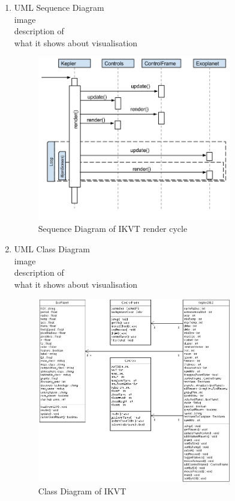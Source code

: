 \begin{enumerate}


 \item UML Sequence Diagram
  \\image\\description of\\what it shows about visualisation
   \begin{figure}[h!]
  \centering
      \includegraphics[width=0.8\textwidth]{images/sequence.png}
  \caption{Sequence Diagram of IKVT render cycle}  
\end{figure}

 \item UML Class Diagram
 \\image\\description of\\what it shows about visualisation
 \begin{figure}[h!]
  \centering
      \includegraphics[width=0.8\textwidth]{images/classDiagram.png}
  \caption{Class Diagram of IKVT}  
\end{figure}
 

\end{enumerate}

